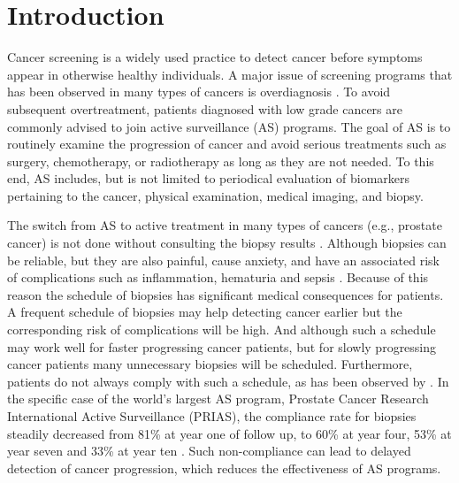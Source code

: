 \section{Introduction}
\label{sec : introduction}
Cancer screening is a widely used practice to detect cancer before symptoms appear in otherwise healthy individuals. A major issue of screening programs that has been observed in many types of cancers is overdiagnosis \citep{esserman2014addressing}. To avoid subsequent overtreatment, patients diagnosed with low grade cancers are commonly advised to join active surveillance (AS) programs. The goal of AS is to routinely examine the progression of cancer and avoid serious treatments such as surgery, chemotherapy, or radiotherapy as long as they are not needed. To this end, AS includes, but is not limited to periodical evaluation of biomarkers pertaining to the cancer, physical examination, medical imaging, and biopsy.

The switch from AS to active treatment in many types of cancers (e.g., prostate cancer) is not done without consulting the biopsy results \citep{bokhorst2016decade}. Although biopsies can be reliable, but they are also painful, cause anxiety, and have an associated risk of complications such as inflammation, hematuria and sepsis \citep{loeb2013systematic,mueller1988severe}. Because of this reason the schedule of biopsies has significant medical consequences for patients. A frequent schedule of biopsies may help detecting cancer earlier but the corresponding risk of complications will be high. And although such a schedule may work well for faster progressing cancer patients, but for slowly progressing cancer patients many unnecessary biopsies will be scheduled. Furthermore, patients do not always comply with such a schedule, as has been observed by \citet{bokhorst2015compliance}. In the specific case of the world's largest AS program, Prostate Cancer Research International Active Surveillance (PRIAS), the compliance rate for biopsies steadily decreased from 81\% at year one of follow up, to 60\% at year four, 53\% at year seven and 33\% at year ten \citep{bokhorst2016decade}. Such non-compliance can lead to delayed detection of cancer progression, which reduces the effectiveness of AS programs.

